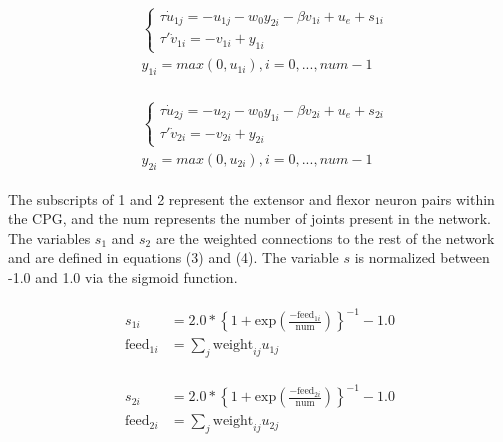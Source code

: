 \documentclass{acm_proc_article-sp}
\begin{document}
\begin{multline}
\begin{aligned}
    &\begin{cases}
        \tau\dot{u}_{1j} = -u_{1j} - w_{0}y_{2i} - \beta v_{1i} + u_e + s_{1i} \\
        \tau'\dot{v}_{1i} = -v_{1i} + y_{1i}
    \end{cases}
    \\
    &y_{1i} = max(0, u_{1i}), i = 0,...,num-1
\end{aligned}
\end{multline}

\begin{multline}
\begin{aligned}
    &\begin{cases}
        \tau\dot{u}_{2j} = -u_{2j} - w_{0}y_{1i} - \beta v_{2i} + u_e + s_{2i} \\
        \tau'\dot{v}_{2i} = -v_{2i} + y_{2i}
    \end{cases}
    \\
    &y_{2i} = max(0, u_{2i}), i = 0,...,num-1
\end{aligned}
\end{multline}

The subscripts of 1 and 2 represent the extensor and flexor neuron pairs within the CPG, and the num
represents the number of joints present in the network.  The variables
$s_1$ and $s_2$ are the weighted connections to the rest of the network
and are defined in equations (3) and (4). The variable $s$ is normalized
between -1.0 and 1.0 via the sigmoid function.

\begin{multline}
\begin{aligned}
    s_{1i} &= 2.0 *  \left\{1 + \text{exp}\left(\frac{-\text{feed}_{1i}}{\text{num}}\right)\right\}^{-1} - 1.0 \\ 
    \text{feed}_{1i} &= \sum_j \text{weight}_{ij}u_{1j}
\end{aligned}
\end{multline}

\begin{multline}
\begin{aligned}
    s_{2i} &= 2.0 *  \left\{1 + \text{exp}\left(\frac{-\text{feed}_{2i}}{\text{num}}\right)\right\}^{-1} - 1.0 \\ 
    \text{feed}_{2i} &= \sum_j \text{weight}_{ij}u_{2j}
\end{aligned}
\end{multline}
\end{document}
